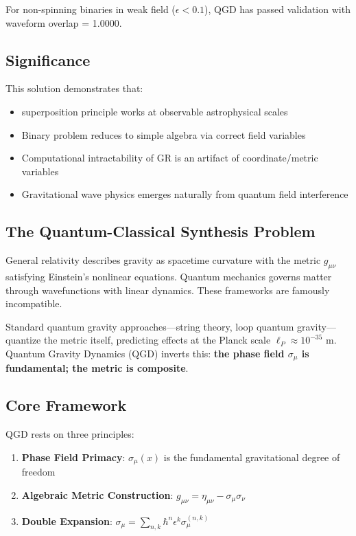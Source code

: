 \documentclass[11pt,a4paper]{article}
\theoremstyle{definition}
\theoremstyle{remark}
\begin{document}
	For non-spinning binaries in weak field ($\epsilon < 0.1$), QGD has passed validation with waveform overlap = 1.0000.
	
	\subsection{Significance}
	
	This solution demonstrates that:
	\begin{itemize}
		\item superposition principle works at observable astrophysical scales
		\item Binary problem reduces to simple algebra via correct field variables
		\item Computational intractability of GR is an artifact of coordinate/metric variables
		\item Gravitational wave physics emerges naturally from quantum field interference
	\end{itemize}
	
	\subsection{The Quantum-Classical Synthesis Problem}
	
	General relativity describes gravity as spacetime curvature with the metric $g_{\mu\nu}$ satisfying Einstein's nonlinear equations. Quantum mechanics governs matter through wavefunctions with linear dynamics. These frameworks are famously incompatible.
	
	Standard quantum gravity approaches—string theory, loop quantum gravity—quantize the metric itself, predicting effects at the Planck scale $\ell_P \approx 10^{-35}$ m. Quantum Gravity Dynamics (QGD) inverts this: \textbf{the phase field $\sigma_\mu$ is fundamental; the metric is composite}.
	
	\subsection{Core Framework}
	
	QGD rests on three principles:
	
	\begin{enumerate}
		\item \textbf{Phase Field Primacy}: $\sigma_\mu(x)$ is the fundamental gravitational degree of freedom
		\item \textbf{Algebraic Metric Construction}: $g_{\mu\nu} = \eta_{\mu\nu} - \sigma_\mu\sigma_\nu$
		\item \textbf{Double Expansion}: $\sigma_\mu = \sum_{n,k} \hbar^n\epsilon^k\sigma_\mu^{(n,k)}$
	\end{enumerate}
	
\end{document}
